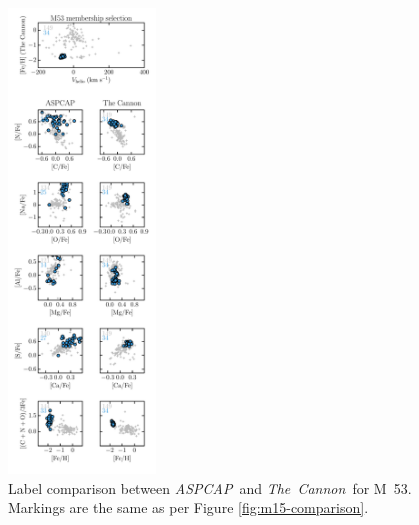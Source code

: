 \documentclass[12pt,preprint]{aastex6}
\newcommand{\project}[1]{\textsl{#1}}
\newcommand{\TheCannon}{\project{The~Cannon}}
\newcommand{\acronym}[1]{{\small{#1}}}
\newcommand{\aspcap}{\project{\acronym{ASPCAP}}}
\begin{document}
\begin{figure}[p]
\centering
\includegraphics[width=0.35\textwidth]{M53_comparison.pdf}
\caption{Label comparison between \aspcap\ and \TheCannon\ for M~53.
Markings are the same as per Figure \ref{fig:m15-comparison}.
\label{fig:m53-comparison}}
\end{figure}

\clearpage
\end{document}
